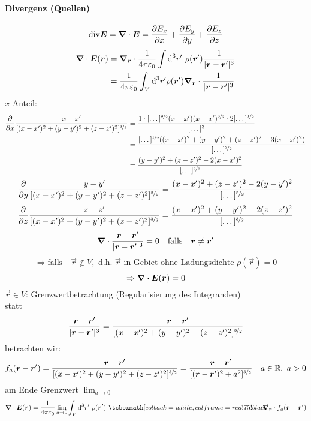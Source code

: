 \paragraph{Divergenz (Quellen)}

$$\tx{div} \vec{E} = \vabla \cdot \vec{E} = \prt{E_x}{x} + \prt{E_y}{y} + \prt{E_z}{z}$$
\begin{align*}
\vabla \cdot \vec{E}(\vec{r}) &= \vabla_{\vec{r}} \cdot \kq \int\dd^3r'\ \rho(\vec{r}') \frac{1}{|\vec{r} - \vec{r}'|^3}\\
&= \kq \int_V \dd^3 r' \rho (\vec{r}') \vabla_{\vec{r}} \cdot \frac{1}{|\vec{r} - \vec{r}'|^3}
\end{align*}
$x$-Anteil:
\begin{align*}
\frac{\partial}{\partial x}\frac{x-x'}{[(x-x')^2 + (y-y')^2 + (z-z')^2]^{\nicefrac{3}{2}}} &= \frac{1 \cdot [\dots]^{\nicefrac{3}{2}}(x - x')(x - x')^{\nicefrac{3}{2}}\cdot 2[\dots]^{\nicefrac{1}{2}}}{[\dots]^3}\\
&= \frac{[\dots]^{\nicefrac{1}{2}}((x - x')^2 + (y - y')^2 + (z - z')^2 - 3(x - x')^2)}{[\dots]^{\nicefrac{3}{2}}}\\
&= \frac{(y - y')^2 + (z - z')^2 - 2(x - x')^2}{[\dots]^{\nicefrac{3}{2}}}
\end{align*}
$$\frac{\partial}{\partial y} \frac{y-y'}{[(x-x')^2 + (y-y')^2 + (z-z')^2]^{\nicefrac{3}{2}}} = \frac{(x - x')^2 + (z - z')^2 - 2(y - y')^2}{[\dots]^{\nicefrac{3}{2}}}$$ 
$$\frac{\partial}{\partial z} \frac{z-z'}{[(x-x')^2 + (y-y')^2 + (z-z')^2]^{\nicefrac{3}{2}}} = \frac{(x - x')^2 + (y - y')^2 - 2(z - z')^2}{[\dots]^{\nicefrac{3}{2}}}$$ 
$$\vabla \cdot \frac{\vec{r} - \vec{r}'}{|\vec{r} - \vec{r}'|^3} = 0 \quad \textrm{falls} \quad \vec{r} \neq \vec{r}'$$
$$\Rightarrow \textrm{falls} \quad \vec{r} \notin V, \textrm{ d.h. } \vec{r} \textrm{ in Gebiet ohne Ladungsdichte } \rho(\vec{r}) = 0$$
$$\Rightarrow \vabla \cdot \vec{E}(\vec{r}) = 0$$ 
%
%
%
%
%
%
$\vec{r} \in V$: Grenzwertbetrachtung (Regularisierung des Integranden)\\
statt
$$\frac{\vec{r} - \vec{r}'}{|\vec{r} - \vec{r}'|^3} = \frac{\vec{r}-\vec{r}'}{[(x-x')^2 + (y-y')^2 + (z-z')^2]^{\nicefrac{3}{2}}}$$
betrachten wir:
$$f_a (\vec{r}-\vec{r}') = \frac{\vec{r}-\vec{r}'}{[(x-x')^2 + (y-y')^2 + (z-z')^2]^{\nicefrac{3}{2}}} = \frac{\vec{r}-\vec{r}'}{[(\vec{r}-\vec{r}')^2 + a^2]^{\nicefrac{3}{2}}} \quad a \in \mathbb R,\ a>0$$
am Ende Grenzwert $\displaystyle{\lim_{a \to 0}}$
$$\vabla \cdot \vec{E} (\vec{r}) = \kq \lim_{a \to 0} \int_V \dd^3r'\ \rho(\vec{r}')\ \rmbox{\hspace{-10pt}\vabla_{\vec{r}}\cdot f_a(\vec{r}-\vec{r}')}$$

